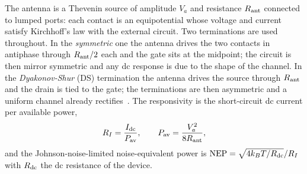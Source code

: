 The antenna is a Thevenin source of amplitude $V_{a}$ and resistance $R_{\mathrm{ant}}$
connected to lumped ports: each contact is an equipotential whose voltage and
current satisfy Kirchhoff's law with the external circuit. Two terminations
are used throughout. In the \emph{symmetric} one the antenna drives the two
contacts in antiphase through $R_{\mathrm{ant}}/2$ each and the gate sits at the
midpoint; the circuit is then mirror symmetric and any dc response is due to
the shape of the channel. In the \emph{Dyakonov-Shur} (DS) termination the
antenna drives the source through $R_{\mathrm{ant}}$ and the drain is tied to the gate;
the terminations are then asymmetric and a uniform channel already
rectifies~\cite{dyakonov1996detection}. The responsivity is the
short-circuit dc current per available power,
\begin{equation}
R_{I}=\frac{I_{\mathrm{dc}}}{P_{\mathrm{av}}},\qquad P_{\mathrm{av}}=\frac{V_{a}^{2}}{8R_{\mathrm{ant}}},
\end{equation}
and the Johnson-noise-limited noise-equivalent power is
$\mathrm{NEP}=\sqrt{4k_{B} T/R_{\mathrm{dc}}}/R_{I}$ with $R_{\mathrm{dc}}$ the dc resistance of the
device.

